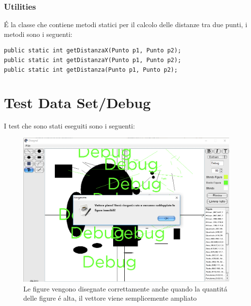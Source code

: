 \documentclass[a4paper,12pt,times,numbered,print,index]{article}
\begin{document}
\subsubsection{Utilities}
É la classe che contiene metodi statici per il calcolo delle distanze tra due punti, i metodi sono i seguenti:
\begin{lstlisting}
public static int getDistanzaX(Punto p1, Punto p2);
public static int getDistanzaY(Punto p1, Punto p2);
public static int getDistanza(Punto p1, Punto p2);
\end{lstlisting}

\section{Test Data Set/Debug}
I test che sono stati eseguiti sono i seguenti:
\begin{figure}
  \includegraphics[scale=.5]{Immagini/Debug/test1.png}
  \caption[Disegno delle figure]{Le figure vengono disegnate correttamente anche quando la quantitá delle figure é alta, il vettore viene semplicemente ampliato}
\end{figure}
\end{document}
